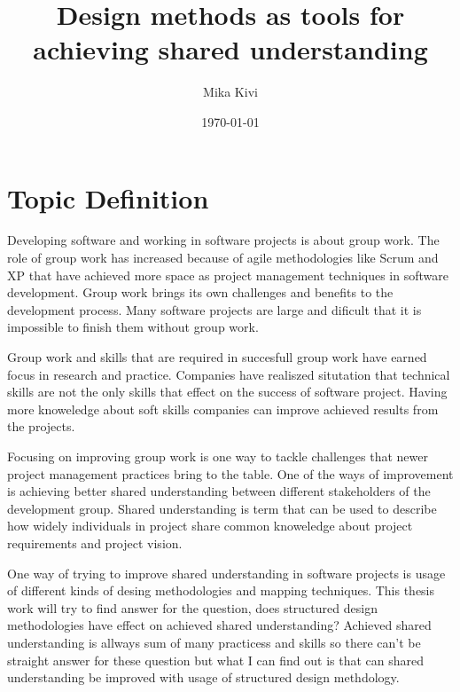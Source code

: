 \documentclass[english]{tktltiki2}
\title{Design methods as tools for achieving shared understanding}
\author{Mika Kivi}
\date{\today}
\theoremstyle{definition}
\theoremstyle{remark}
\begin{document}

\frontmatter      %

\maketitle        %
\makeabstract     %

\tableofcontents  %


\mainmatter       %

\section{Topic Definition}

Developing software and working in software projects is about group work. The role of group work has increased because of agile methodologies like Scrum\cite{scrum} and XP\cite{XP} that have achieved more space as project management techniques in software development. Group work brings its own challenges and benefits to the development process. Many software projects are large and dificult that it is impossible to finish them without group work.

Group work and skills that are required in succesfull group work have earned focus in research and practice. Companies have realiszed situtation that technical skills are not the only skills that effect on the success of software project. Having more knoweledge about soft skills companies can improve achieved results from the projects.

Focusing on improving group work is one way to tackle challenges that newer project management practices bring to the table. One of the ways of improvement is achieving better shared understanding between different stakeholders of the development group. Shared understanding is term that can be used to describe how widely individuals in project share common knoweledge about project requirements and project vision\cite{organizationalStructure}.

One way of trying to improve shared understanding in software projects is usage of different kinds of desing methodologies and mapping techniques. This thesis work will try to find answer for the question, does structured design methodologies have effect on achieved shared understanding? Achieved shared understanding is allways sum of many practicess and skills so there can't be straight answer for these question but what I can find out is that can shared understanding be improved with usage of structured design methdology.
\end{document}
